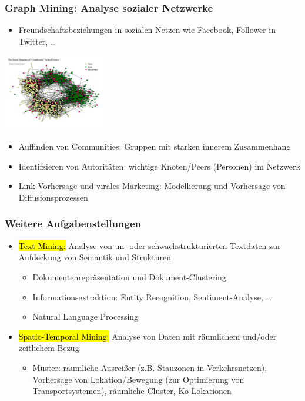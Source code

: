 \begin{frame}
\frametitle{Graph Mining: Analyse sozialer Netzwerke}

\begin{itemize}
\item Freundschaftsbeziehungen in sozialen Netzen wie Facebook,
  Follower in Twitter, \dots
\end{itemize}

\begin{minipage}[c]{4.5cm}
\includegraphics[width=4.5cm]{fig1/graph.png}
\end{minipage}\quad
\begin{minipage}[c]{5.5cm}
{\small
\begin{itemize}
\item Auffinden von Communities: Gruppen mit starken innerem
  Zusammenhang
\item Identifzieren von Autoritäten: wichtige Knoten/Peers (Personen)
  im Netzwerk
\item Link-Vorhersage und virales Marketing: Modellierung und
  Vorhersage von Diffusionsprozessen
\end{itemize}}
\end{minipage}

\end{frame}


\begin{frame}
\frametitle{Weitere Aufgabenstellungen}

\begin{itemize}
\item \hl{Text Mining:} Analyse von un- oder schwachstrukturierten Textdaten zur Aufdeckung von Semantik und Strukturen
\begin{itemize}
\item Dokumentenrepräsentation und Dokument-Clustering
\item Informationsextraktion: Entity Recognition, Sentiment-Analyse, \dots
\item Natural Language Processing
\end{itemize}
\item \hl{Spatio-Temporal Mining:} Analyse von Daten mit räumlichem
  und/oder zeitlichem Bezug
\begin{itemize}
\item Muster: räumliche Ausreißer (z.B. Stauzonen in Verkehrsnetzen),
  Vorhersage von Lokation/Bewegung (zur Optimierung von
  Transportsystemen), räumliche Cluster, Ko-Lokationen
\end{itemize}
\end{itemize}
\end{frame}


